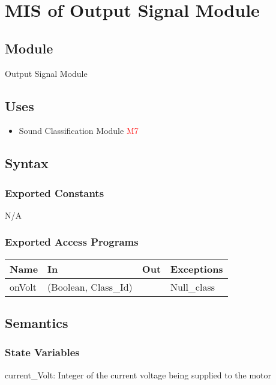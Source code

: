\documentclass[12pt, titlepage]{article}
\begin{document}
\newpage 

\section{MIS of Output Signal Module} \label{Output Signal Module}
\subsection{Module}
Output Signal Module
\subsection{Uses}
\begin{itemize}
  \item Sound Classification Module \textcolor{red}{M7}
  \end{itemize}

\subsection{Syntax}

\subsubsection{Exported Constants}
N/A

\subsubsection{Exported Access Programs}

\begin{center}
\begin{tabular}{p{4cm} p{4cm} p{4cm} p{4cm}}
\hline
\textbf{Name} & \textbf{In} & \textbf{Out} & \textbf{Exceptions} \\
\hline
onVolt & (Boolean, Class\_Id) &  & Null\_class\\
\hline
\end{tabular}
\end{center}

\subsection{Semantics}

\subsubsection{State Variables}

current\_Volt: Integer of the current voltage being supplied to the motor
\end{document}
